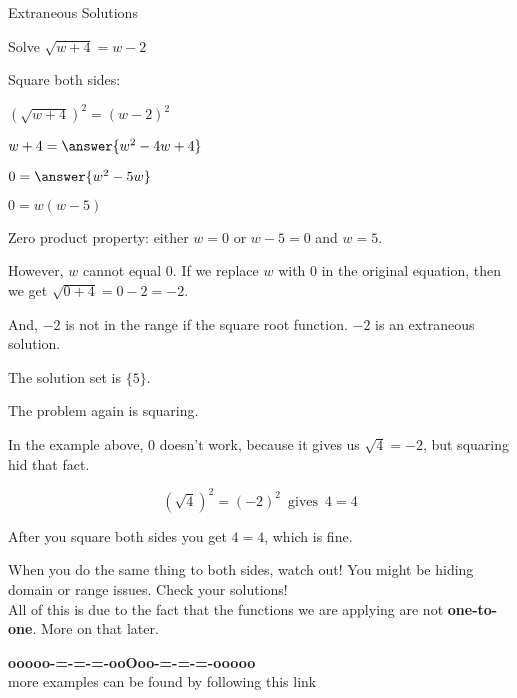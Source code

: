 \documentclass{ximera}
\begin{document}
\begin{example} Extraneous Solutions

Solve $\sqrt{w+4} = w - 2$


\begin{explanation}

Square both sides:



$(\sqrt{w+4})^2 = (w - 2)^2$


$w + 4 = \answer{w^2 - 4w + 4}$


$0 = \answer{w^2 - 5w}$

$0 = w(w-5) $


Zero product property:  either $w=0$ or $w-5=0$ and $w=5$.



However, $w$ cannot equal $0$.  If we replace $w$ with $0$ in the original equation, then we get $\sqrt{0+4} = 0 - 2 = -2$.

And, $-2$ is not in the range if the square root function. $-2$ is an extraneous solution.

The solution set is $\{ 5 \}$.

\end{explanation}

\end{example}


The problem again is squaring.

In the example above, $0$ doesn't work, because it gives us $\sqrt{4} = -2$, but squaring hid that fact.  


\[ (\sqrt{4})^2 = (-2)^2 \, \text{ gives } \, 4 = 4\]


After you square both sides you get $4 = 4$, which is fine.





When you do the same thing to both sides, watch out!  You might be hiding domain or range issues.  Check your solutions! \\




All of this is due to the fact that the functions we are applying are not \textbf{one-to-one}.  More on that later.















\begin{center}
\textbf{\textcolor{green!50!black}{ooooo-=-=-=-ooOoo-=-=-=-ooooo}} \\

more examples can be found by following this link\\ 

\end{center}
\end{document}

